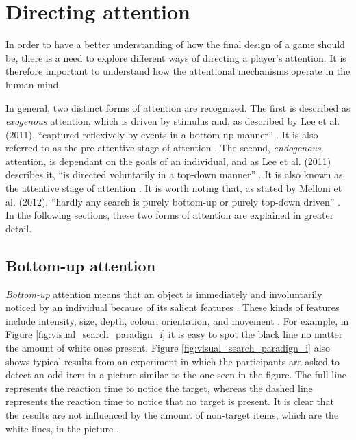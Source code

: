 \section{Directing attention}\label{sec:direct_attention}
In order to have a better understanding of how the final design of a game should be, there is a need to explore different ways of directing a player's attention. It is therefore important to understand how the attentional mechanisms operate in the human mind.

In general, two distinct forms of attention are recognized. The first is described as \textit{exogenous} attention, which is driven by stimulus and, as described by Lee et al. (2011), “captured reflexively by events in a bottom-up manner” \cite{lee2011efficient}. It is also referred to as the pre-attentive stage of attention \cite{zhai2008scalable}. The second, \textit{endogenous} attention, is dependant on the goals of an individual, and as Lee et al. (2011) describes it, “is directed voluntarily in a top-down manner” \cite{lee2011efficient}. It is also known as the attentive stage of attention \cite{zhai2008scalable}. It is worth noting that, as stated by Melloni et al. (2012), “hardly any search is purely bottom-up or purely top-down driven” \cite{melloni2012interaction}. In the following sections, these two forms of attention are explained in greater detail.

\subsection{Bottom-up attention}\label{subsec:bottomup_attention}
\textit{Bottom-up} attention means that an object is immediately and involuntarily noticed by an individual because of its salient features \cite{melloni2012interaction}. These kinds of features include intensity, size, depth, colour, orientation, and movement \cite{zhai2008scalable}. For example, in Figure \ref{fig:visual_search_paradign_i} it is easy to spot the black line no matter the amount of white ones present. Figure \ref{fig:visual_search_paradign_i} also shows typical results from an experiment in which the participants are asked to detect an odd item in a picture similar to the one seen in the figure. The full line represents the reaction time to notice the target, whereas the dashed line represents the reaction time to notice that no target is present. It is clear that the results are not influenced by the amount of non-target items, which are the white lines, in the picture \cite{snowden2012basic}.

